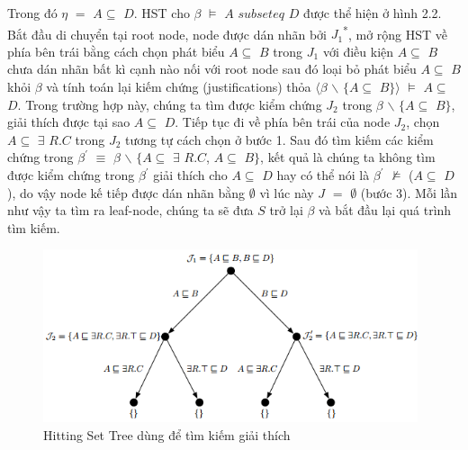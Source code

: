 Trong đó $\eta$ $=$ $A\subseteq$ $D$. HST cho $\beta$ $\models$ $A$ $subseteq$ $D$ được thể hiện ở hình 2.2. Bắt đầu di chuyển tại root node, node được dán nhãn bởi $J_{1}$\textsuperscript{*}, mở rộng HST về phía bên trái bằng cách chọn phát biểu $A\subseteq$ $B$ trong $J_{1}$ với điều kiện $A\subseteq$ $B$ chưa dán nhãn bất kì cạnh nào nối với root node sau đó loại bỏ phát biểu $A\subseteq$ $B$ khỏi $\beta$ và tính toán lại kiếm chứng (justifications) thỏa $\langle\beta$ $\backslash$ $\{A\subseteq$ $B\}\rangle$ $\models$ $A\subseteq$ $D$. Trong trường hợp này, chúng ta tìm được kiểm chứng $J_{2}$ trong $\beta$ $\backslash$ $\{A\subseteq$ $B\}$, giải thích được tại sao $A\subseteq$ $D$. Tiếp tục đi về phía bên trái của node $J_{2}$, chọn $A\subseteq$ $\exists$ $R.C$ trong $J_{2}$ tương tự cách chọn ở bước 1. Sau đó tìm kiếm các kiểm chứng trong $\beta^{'}$ $\equiv$ $\beta$ $\backslash$ $\{A\subseteq$ $\exists$ $R.C$, $A\subseteq$ $B\}$, kết quả là chúng ta không tìm được kiểm chứng trong $\beta^{'}$ giải thích cho $A\subseteq$ $D$ hay có thể nói là $\beta^{'}$ $\not\models$ ($A\subseteq$ $D$), do vậy node kế tiếp được dán nhãn bằng $\emptyset$ vì lúc này $J$ $=$ $\emptyset$ (bước 3). Mỗi lần như vậy ta tìm ra leaf-node, chúng ta sẽ đưa $S$ trở lại $\beta$ và bắt đầu lại quá trình tìm kiếm.
\begin{figure}[ht!]
	\centering
	\includegraphics[width=110mm]{Figures/fig2.png}
	\caption{Hitting Set Tree dùng để tìm kiếm giải thích \label{overflow}}
\end{figure}
